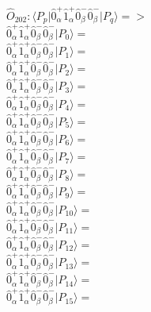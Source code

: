 \documentclass[14pt]{article}
\begin{document}
    $\hat{O}_{202}:  \langle{P_p}\vert \hat{0}_{\alpha}^{+}\hat{1}_{\alpha}^{+}\hat{0}_{\beta}^{-}\hat{0}_{\beta}^{-} \vert{P_q}\rangle => $ \\ 
    $ \hat{0}_{\alpha}^{+}\hat{1}_{\alpha}^{+}\hat{0}_{\beta}^{-}\hat{0}_{\beta}^{-} \vert{P_{0}}\rangle =  $ \\ 
    $ \hat{0}_{\alpha}^{+}\hat{1}_{\alpha}^{+}\hat{0}_{\beta}^{-}\hat{0}_{\beta}^{-} \vert{P_{1}}\rangle =  $ \\ 
    $ \hat{0}_{\alpha}^{+}\hat{1}_{\alpha}^{+}\hat{0}_{\beta}^{-}\hat{0}_{\beta}^{-} \vert{P_{2}}\rangle =  $ \\ 
    $ \hat{0}_{\alpha}^{+}\hat{1}_{\alpha}^{+}\hat{0}_{\beta}^{-}\hat{0}_{\beta}^{-} \vert{P_{3}}\rangle =  $ \\ 
    $ \hat{0}_{\alpha}^{+}\hat{1}_{\alpha}^{+}\hat{0}_{\beta}^{-}\hat{0}_{\beta}^{-} \vert{P_{4}}\rangle =  $ \\ 
    $ \hat{0}_{\alpha}^{+}\hat{1}_{\alpha}^{+}\hat{0}_{\beta}^{-}\hat{0}_{\beta}^{-} \vert{P_{5}}\rangle =  $ \\ 
    $ \hat{0}_{\alpha}^{+}\hat{1}_{\alpha}^{+}\hat{0}_{\beta}^{-}\hat{0}_{\beta}^{-} \vert{P_{6}}\rangle =  $ \\ 
    $ \hat{0}_{\alpha}^{+}\hat{1}_{\alpha}^{+}\hat{0}_{\beta}^{-}\hat{0}_{\beta}^{-} \vert{P_{7}}\rangle =  $ \\ 
    $ \hat{0}_{\alpha}^{+}\hat{1}_{\alpha}^{+}\hat{0}_{\beta}^{-}\hat{0}_{\beta}^{-} \vert{P_{8}}\rangle =  $ \\ 
    $ \hat{0}_{\alpha}^{+}\hat{1}_{\alpha}^{+}\hat{0}_{\beta}^{-}\hat{0}_{\beta}^{-} \vert{P_{9}}\rangle =  $ \\ 
    $ \hat{0}_{\alpha}^{+}\hat{1}_{\alpha}^{+}\hat{0}_{\beta}^{-}\hat{0}_{\beta}^{-} \vert{P_{10}}\rangle =  $ \\ 
    $ \hat{0}_{\alpha}^{+}\hat{1}_{\alpha}^{+}\hat{0}_{\beta}^{-}\hat{0}_{\beta}^{-} \vert{P_{11}}\rangle =  $ \\ 
    $ \hat{0}_{\alpha}^{+}\hat{1}_{\alpha}^{+}\hat{0}_{\beta}^{-}\hat{0}_{\beta}^{-} \vert{P_{12}}\rangle =  $ \\ 
    $ \hat{0}_{\alpha}^{+}\hat{1}_{\alpha}^{+}\hat{0}_{\beta}^{-}\hat{0}_{\beta}^{-} \vert{P_{13}}\rangle =  $ \\ 
    $ \hat{0}_{\alpha}^{+}\hat{1}_{\alpha}^{+}\hat{0}_{\beta}^{-}\hat{0}_{\beta}^{-} \vert{P_{14}}\rangle =  $ \\ 
    $ \hat{0}_{\alpha}^{+}\hat{1}_{\alpha}^{+}\hat{0}_{\beta}^{-}\hat{0}_{\beta}^{-} \vert{P_{15}}\rangle =  $ \\ 
    
\end{document}
